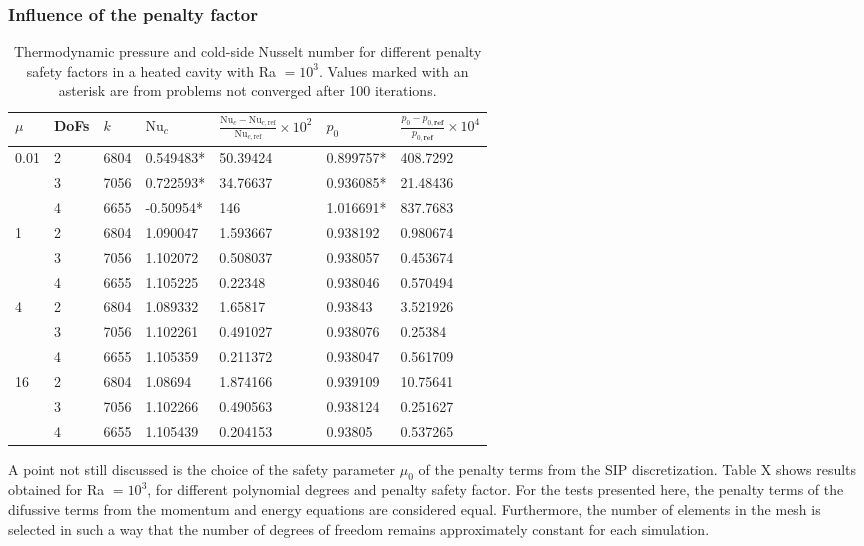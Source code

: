 \subsubsection{Influence of the penalty factor}
\begin{table}[h]
\centering
\begin{tabular}{lllllll}
	\hline \vspace{0.1cm}
		$\mu$                  & DoFs & $k$ & $\text{Nu}_c$ &  $\frac{\text{Nu}_c - \text{Nu}_{c,\text{ref}}} {\text{Nu}_{c,\text{ref}}}\times 10^2 $   & $p_0$    & $\frac{p_0 - p_{0,\textbf{ref}}} {p_{0,\textbf{ref} }}\times 10^4 $ \\ \hline
\multirow{3}{*}{0.01} & 2 & 6804 & 0.549483* & 50.39424 & 0.899757* & 408.7292 \\
                      & 3 & 7056 & 0.722593* & 34.76637 & 0.936085* & 21.48436 \\
                      & 4 & 6655 & -0.50954* & 146      & 1.016691* & 837.7683 \\ \hline
\multirow{3}{*}{1}    & 2 & 6804 & 1.090047 & 1.593667 & 0.938192 & 0.980674 \\
                      & 3 & 7056 & 1.102072 & 0.508037 & 0.938057 & 0.453674 \\
                      & 4 & 6655 & 1.105225 & 0.22348  & 0.938046 & 0.570494 \\ \hline
\multirow{3}{*}{4}    & 2 & 6804 & 1.089332 & 1.65817  & 0.93843  & 3.521926 \\
                      & 3 & 7056 & 1.102261 & 0.491027 & 0.938076 & 0.25384  \\
                      & 4 & 6655 & 1.105359 & 0.211372 & 0.938047 & 0.561709 \\ \hline
\multirow{3}{*}{16}   & 2 & 6804 & 1.08694  & 1.874166 & 0.939109 & 10.75641 \\
                      & 3 & 7056 & 1.102266 & 0.490563 & 0.938124 & 0.251627 \\
                      & 4 & 6655 & 1.105439 & 0.204153 & 0.93805  & 0.537265 \\ \hline
\end{tabular}
\caption{Thermodynamic pressure and cold-side Nusselt number for different penalty safety factors in a heated cavity with Ra $=10^3$. Values marked with an asterisk are from problems not converged after 100 iterations.}
\end{table}
A point not still discussed is the choice of the safety parameter $\mu_0$ of the penalty terms from the SIP discretization.  Table X shows results obtained for Ra $=10^3$, for different polynomial degrees and penalty safety factor.  For the tests presented here, the penalty terms of the difussive terms from the momentum and energy equations are considered equal. Furthermore, the number of elements in the mesh is selected in such a way that the number of degrees of freedom remains approximately constant for each simulation. 


